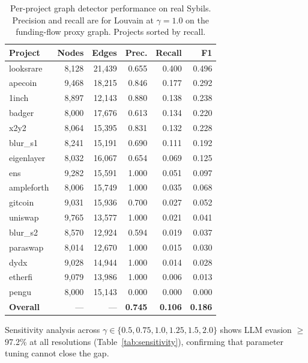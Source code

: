 \documentclass[sigconf,nonacm=false]{acmart}
\begin{document}
\begin{table}[t]
\caption{Per-project graph detector performance on real Sybils. Precision and recall are for Louvain at $\gamma{=}1.0$ on the funding-flow proxy graph. Projects sorted by recall.}
\label{tab:graph_stats}
\small
\begin{tabular}{lrrrrr}
\toprule
Project & Nodes & Edges & Prec. & Recall & F1 \\
\midrule
looksrare   & 8,128  & 21,439 & 0.655 & 0.400 & 0.496 \\
apecoin     & 9,468  & 18,215 & 0.846 & 0.177 & 0.292 \\
1inch       & 8,897  & 12,143 & 0.880 & 0.138 & 0.238 \\
badger      & 8,000  & 17,676 & 0.613 & 0.134 & 0.220 \\
x2y2        & 8,064  & 15,395 & 0.831 & 0.132 & 0.228 \\
blur\_s1    & 8,241  & 15,191 & 0.690 & 0.111 & 0.192 \\
eigenlayer  & 8,032  & 16,067 & 0.654 & 0.069 & 0.125 \\
ens         & 9,282  & 15,591 & 1.000 & 0.051 & 0.097 \\
ampleforth  & 8,006  & 15,749 & 1.000 & 0.035 & 0.068 \\
gitcoin     & 9,031  & 15,936 & 0.700 & 0.027 & 0.052 \\
uniswap     & 9,765  & 13,577 & 1.000 & 0.021 & 0.041 \\
blur\_s2    & 8,570  & 12,924 & 0.594 & 0.019 & 0.037 \\
paraswap    & 8,014  & 12,670 & 1.000 & 0.015 & 0.030 \\
dydx        & 9,028  & 14,944 & 1.000 & 0.014 & 0.028 \\
etherfi     & 9,079  & 13,986 & 1.000 & 0.006 & 0.013 \\
pengu       & 8,000  & 15,143 & 0.000 & 0.000 & 0.000 \\
\midrule
\textbf{Overall} & --- & --- & \textbf{0.745} & \textbf{0.106} & \textbf{0.186} \\
\bottomrule
\end{tabular}
\end{table}

Sensitivity analysis across $\gamma \in \{0.5, 0.75, 1.0, 1.25, 1.5, 2.0\}$ shows LLM evasion $\ge$97.2\% at all resolutions (Table~\ref{tab:sensitivity}), confirming that parameter tuning cannot close the gap.
\end{document}
